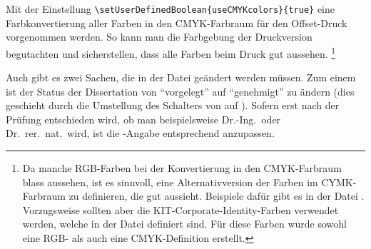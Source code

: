 Mit der Einstellung
\lstinline|\setUserDefinedBoolean{useCMYKcolors}{true}|
eine Farbkonvertierung aller Farben in den CMYK-Farbraum für den Offset-Druck vorgenommen werden.
So kann man die Farbgebung der Druckversion begutachten und sicherstellen, dass alle Farben beim Druck gut aussehen.%
\footnote{Da manche RGB-Farben bei der Konvertierung in den CMYK-Farbraum blass aussehen,
ist es sinnvoll, eine Alternativversion der Farben im CYMK-Farbraum zu definieren,
die gut aussieht.
Beispiele dafür gibt es in der Datei .
Vorzugsweise sollten aber die KIT-Corporate-Identity-Farben verwendet werden,
welche in der Datei  definiert sind.
Für diese Farben wurde sowohl eine RGB- als auch eine CMYK-Definition erstellt.}


Auch gibt es zwei Sachen, die in der Datei 
geändert werden müssen.
Zum einem ist der Status der Dissertation von \enquote{vorgelegt} auf \enquote{genehmigt} zu ändern
(dies geschieht durch die Umstellung des Schalters
von  auf ).
Sofern erst nach der Prüfung entschieden wird, ob man beispielsweise Dr.-Ing.\ oder Dr.\ rer.\ nat.\ wird, 
ist die -Angabe entsprechend anzupassen.

